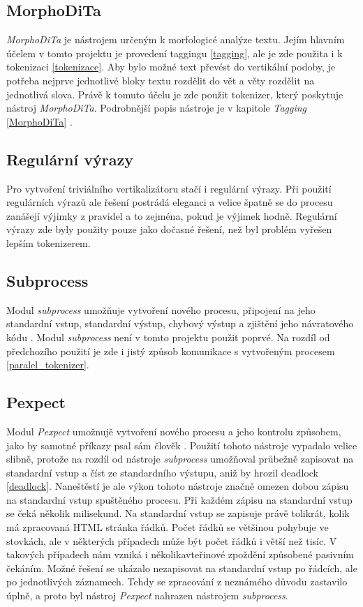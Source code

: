 \subsection{MorphoDiTa}
\textit{MorphoDiTa} je nástrojem určeným k morfologicé analýze textu. Jejím hlavním účelem v tomto projektu je
provedení taggingu \ref{tagging}, ale je zde použita i k tokenizaci \ref{tokenizace}.
Aby bylo možné text převést do vertikální podoby, je potřeba nejprve jednotlivé bloky
textu rozdělit do vět a věty rozdělit na jednotlivá slova. Právě k tomuto účelu
je zde použit tokenizer, který poskytuje nástroj \textit{MorphoDiTa}.
Podrobnější popis nástroje je v kapitole \textit{Tagging} \ref{MorphoDiTa} \cite{MORPHODITA}.

\subsection{Regulární výrazy}
Pro vytvoření triviálního vertikalizátoru stačí i regulární výrazy. Při použití regulárních
výrazů ale řešení postrádá eleganci a velice špatně se do procesu zanášejí výjimky z pravidel
a to zejména, pokud je výjimek hodně. Regulární výrazy zde byly použity pouze jako dočasné
řešení, než byl problém vyřešen lepším tokenizerem.

\subsection{Subprocess}
\label{subprocess}
Modul \textit{subprocess} umožňuje vytvoření nového procesu, připojení na jeho standardní vstup,
standardní výstup, chybový výstup a zjištění jeho návratového kódu \cite{SUBPROCESS}.
Modul \textit{subprocess} není v tomto projektu použit poprvé. Na rozdíl od předchozího použití
je zde i jistý způsob komunikace s vytvořeným procesem \ref{paralel_tokenizer}.

\subsection{Pexpect}
\label{pexpect}
Modul \textit{Pexpect} umožnujě vytvoření nového procesu a jeho kontrolu způsobem,
jako by samotné příkazy psal sám člověk \cite{PEXPECT}. Použití tohoto nástroje
vypadalo velice slibně, protože na rozdíl od nástroje \textit{subprocess} umožňoval průbežně
zapisovat na standardní vstup a číst ze standardního výstupu, aniž by hrozil deadlock \ref{deadlock}.
Naneštěstí je ale výkon tohoto nástroje značně omezen dobou zápisu na standardní vstup
spuštěného procesu. Při každém zápisu na standardní vstup se čeká několik milisekund.
Na standardní vstup se zapisuje právě tolikrát, kolik má zpracovaná HTML stránka řádků.
Počet řádků se většinou pohybuje ve stovkách, ale v některých případech může být počet řádků
i větší než tisíc. V takových případech nám vzniká i několikavteřinové zpoždění způsobené
pasivním čekáním. Možné řešení se ukázalo nezapisovat na standardní vstup po řádcích, ale
po jednotlivých záznamech. Tehdy se zpracování z neznámého důvodu zastavilo úplně, a proto
byl nástroj \textit{Pexpect} nahrazen nástrojem \textit{subprocess}.

